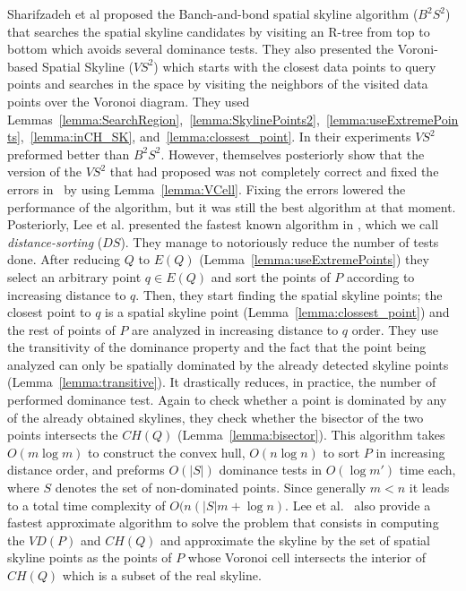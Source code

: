 \documentclass[11pt,onecolumn]{elsart3p}
\begin{document}
        Sharifzadeh et al  \cite{SS06} proposed the Banch-and-bond spatial skyline algorithm ($B^2S^2$) that searches the spatial skyline candidates by visiting an R-tree from top to bottom which avoids several dominance tests. They also presented the Voroni-based Spatial Skyline ($VS^2$) which starts with the closest data points to query points and searches in the space by visiting the neighbors of the visited data points over the Voronoi diagram. They used Lemmas~\ref{lemma:SearchRegion},~\ref{lemma:SkylinePoints2},~\ref{lemma:useExtremePoints},~\ref{lemma:inCH_SK}, and~\ref{lemma:clossest_point}. In their experiments $VS^2$ preformed better than $B^2S^2$. However, themselves posteriorly show that the version of the $VS^2$ that had proposed was not completely correct and fixed the errors in~\cite{SSK09} by using Lemma~\ref{lemma:VCell}. Fixing the errors lowered the performance of the algorithm, but it was still the best algorithm at that moment.\\

        Posteriorly, Lee et al. presented the fastest known algorithm in \cite{LSAH11}, which we call {\it distance-sorting} ($DS$). They manage to notoriously reduce the number of tests done. After reducing $Q$ to $E(Q)$ (Lemma~\ref{lemma:useExtremePoints}) they select an arbitrary point $q\in E(Q)$ and sort the points of $P$ according to increasing distance to $q$. Then, they start finding the spatial skyline points; the closest point to $q$ is a spatial skyline point (Lemma~\ref{lemma:clossest_point}) and the rest of points of $P$ are analyzed in increasing distance to $q$ order. They use the transitivity of the dominance property and the fact that the point being analyzed can only be spatially dominated by the already detected skyline points (Lemma~\ref{lemma:transitive}). It drastically reduces, in practice, the number of performed dominance test. Again to check whether a point is dominated by any of the already obtained skylines, they check whether the bisector of the two points intersects the $CH(Q)$ (Lemma~\ref{lemma:bisector}). This algorithm takes $O(m\log m)$ to construct the convex hull, $O(n\log n)$ to sort $P$ in increasing distance order, and preforms $O(|S|)$ dominance tests in $O(\log m')$ time each, where $S$ denotes the set of non-dominated points. Since generally $m<n$ it leads to a total time complexity of $O(n(|S|m+\log n)$. Lee et al.~\cite{LSAH11} also provide a fastest approximate algorithm to solve the problem that consists in computing the $VD(P)$ and $CH(Q)$ and approximate the skyline by the set of spatial skyline points as the points of $P$ whose Voronoi cell intersects the interior of $CH(Q)$ which is a subset of the real skyline.\\
\end{document}
